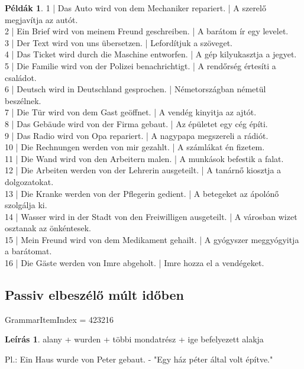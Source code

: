 \documentclass{article}
\theoremstyle{definition}
\newtheorem*{exmp}{Példák}
\newtheorem*{desc}{Leírás}
\begin{document}
\begin{exmp}
1 | Das Auto wird von dem Mechaniker repariert. | A szerelő megjavítja az autót.\\
2 | Ein Brief wird von meinem Freund geschreiben. | A barátom ír egy levelet.\\
3 | Der Text wird von uns übersetzen. | Lefordítjuk a szöveget.\\
4 | Das Ticket wird durch die Maschine entworfen. | A gép kilyukasztja a jegyet.\\
5 | Die Familie wird von der Polizei benachrichtigt. | A rendőrség értesíti a családot.\\
6 | Deutsch wird in Deutschland gesprochen. | Németországban németül beszélnek.\\
7 | Die Tür wird von dem Gast geöffnet. | A vendég kinyitja az ajtót.\\
8 | Das Gebäude wird von der Firma gebaut. | Az épületet egy cég építi.\\
9 | Das Radio wird von Opa repariert. | A nagypapa megszereli a rádiót.\\
10 | Die Rechnungen werden von mir gezahlt. | A számlákat én fizetem.\\
11 | Die Wand wird von den Arbeitern malen. | A munkások befestik a falat.\\
12 | Die Arbeiten werden von der Lehrerin ausgeteilt. | A tanárnő kiosztja a dolgozatokat.\\
13 | Die Kranke werden von der Pflegerin gedient. | A betegeket az ápolónő szolgálja ki.\\
14 | Wasser wird in der Stadt von den Freiwilligen ausgeteilt. | A városban wizet osztanak az önkéntesek.\\
15 | Mein Freund wird von dem Medikament gehailt. | A gyógyszer meggyógyitja a barátomat.\\
16 | Die Gäste werden von Imre abgeholt. | Imre hozza el a vendégeket.\\
\end{exmp}

\subsection{Passiv elbeszélő múlt időben}

GrammarItemIndex = 423216

\begin{desc}
alany + wurden + többi mondatrész + ige befelyezett alakja

Pl.: Ein Haus wurde von Peter gebaut. - "Egy ház péter által volt építve."
\end{desc}
\end{document}
